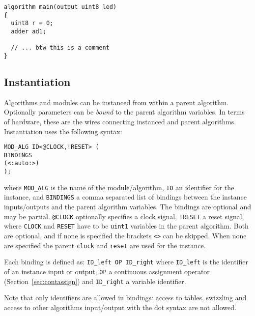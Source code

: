 \documentclass[a4]{article}
\begin{document}
\begin{verbatim}
algorithm main(output uint8 led)
{
  uint8 r = 0;
  adder ad1;
  
  // ... btw this is a comment
}
\end{verbatim}


\subsection{Instantiation}
\label{sec:instantiation}

Algorithms and modules can be instanced from within a parent algorithm. Optionally parameters can be \textit{bound} to the parent algorithm variables. 
In terms of hardware, these are the wires connecting instanced and parent algorithms.
%
Instantiation uses the following syntax:
%
\begin{verbatim}
MOD_ALG ID<@CLOCK,!RESET> (
BINDINGS
(<:auto:>)
);
\end{verbatim}
%
where \texttt{MOD\_ALG} is the name of the module/algorithm, \texttt{ID} an
identifier for the instance, and \texttt{BINDINGS} a comma separated list of 
bindings between the instance inputs/outputs and the parent algorithm variables.
The bindings are optional and may be partial.
\texttt{@CLOCK} optionally specifies a clock signal, \texttt{!RESET} a reset signal, where \texttt{CLOCK} and \texttt{RESET} have to be \texttt{uint1} variables in the parent algorithm. Both are optional, and if none is specified the brackets \texttt{<>} can be skipped. When none are specified the parent \texttt{clock} and \texttt{reset} are used for the instance.

Each binding is defined as:
\texttt{ID\_left OP ID\_right} 
where \texttt{ID\_left}
is the identifier of an instance input or output, \texttt{OP} a continuous
assignment operator (Section~\ref{sec:contassign}) and \texttt{ID\_right} a variable identifier.

Note that only identifiers are allowed in bindings: access to tables, swizzling and access to other algorithms input/output with the dot syntax are not allowed.
\end{document}
